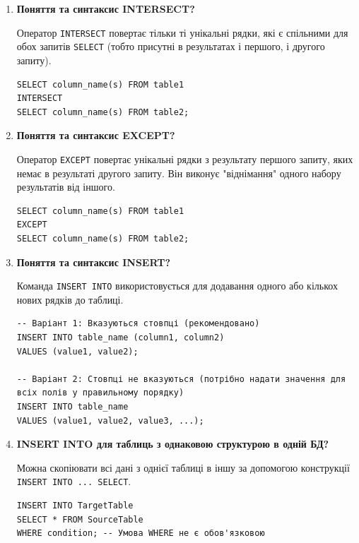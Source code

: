 \documentclass{article}
\begin{document}
\begin{enumerate}[label=\arabic*., leftmargin=*]
        \item \textbf{Поняття та синтаксис INTERSECT?}
        
        Оператор \texttt{INTERSECT} повертає тільки ті унікальні рядки, які є спільними для обох запитів \texttt{SELECT} (тобто присутні в результатах і першого, і другого запиту).
        \begin{CodeBox}
        \begin{verbatim}
SELECT column_name(s) FROM table1
INTERSECT
SELECT column_name(s) FROM table2;
        \end{verbatim}
        \end{CodeBox}

        \item \textbf{Поняття та синтаксис EXCEPT?}
        
        Оператор \texttt{EXCEPT} повертає унікальні рядки з результату першого запиту, яких немає в результаті другого запиту. Він виконує "віднімання" одного набору результатів від іншого.
        \begin{CodeBox}
        \begin{verbatim}
SELECT column_name(s) FROM table1
EXCEPT
SELECT column_name(s) FROM table2;
        \end{verbatim}
        \end{CodeBox}
        
        \item \textbf{Поняття та синтаксис INSERT?}
        
        Команда \texttt{INSERT INTO} використовується для додавання одного або кількох нових рядків до таблиці.
        \begin{CodeBox}
        \begin{verbatim}
-- Варіант 1: Вказуються стовпці (рекомендовано)
INSERT INTO table_name (column1, column2) 
VALUES (value1, value2);

-- Варіант 2: Стовпці не вказуються (потрібно надати значення для всіх полів у правильному порядку)
INSERT INTO table_name 
VALUES (value1, value2, value3, ...);
        \end{verbatim}
        \end{CodeBox}

        \item \textbf{INSERT INTO для таблиць з однаковою структурою в одній БД?}
        
        Можна скопіювати всі дані з однієї таблиці в іншу за допомогою конструкції \texttt{INSERT INTO ... SELECT}.
        \begin{CodeBox}
        \begin{verbatim}
INSERT INTO TargetTable
SELECT * FROM SourceTable
WHERE condition; -- Умова WHERE не є обов'язковою
        \end{verbatim}
        \end{CodeBox}


\end{enumerate}
\end{document}
